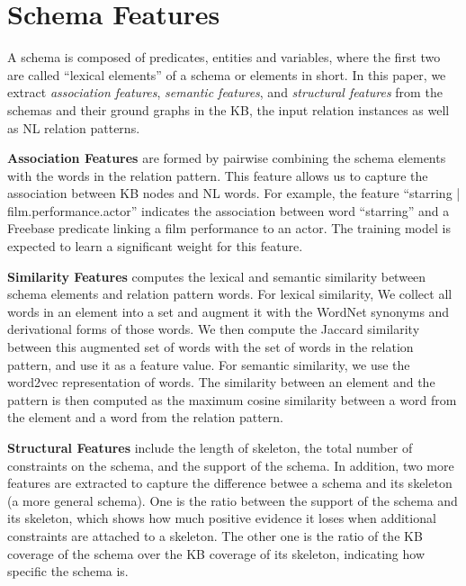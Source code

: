 \section{Schema Features}
\label{sec:feature}

A schema is composed of predicates, entities and variables, where
the first two are called ``lexical elements'' of a schema or elements
in short.
In this paper, we extract {\em association features}, {\em semantic features},
and {\em structural features} from the schemas and their ground graphs 
in the KB, the input relation instances as well as NL relation patterns.

\textbf{Association Features} are formed by pairwise combining 
the schema elements with the words in the relation pattern.
This feature allows us to capture the association between 
KB nodes and NL words.
For example, the feature ``starring | film.performance.actor''
indicates the association between word ``starring'' and a Freebase
predicate linking a film performance to an actor. The training model 
is expected to learn a significant weight for this feature.

\textbf{Similarity Features} computes the lexical and 
semantic similarity between schema elements and 
relation pattern words. For lexical similarity, 
We collect all words in an element into a set and augment it
with the WordNet synonyms and derivational forms of those words.
We then compute the Jaccard similarity between this augmented set of
words with the set of words in the relation pattern, 
and use it as a feature value. For semantic similarity,
we use the word2vec representation of words. 
The similarity between an element 
and the pattern is then computed as the maximum cosine
similarity between a word from the element and a word from the relation
pattern.

\textbf{Structural Features} include the length of skeleton, 
the total number of constraints on the schema, and the support of
the schema. In addition, two more features are extracted to capture
the difference betwee a schema and its skeleton (a more general schema). 
One is the ratio between the support of the schema and its skeleton, 
which shows how much positive evidence it loses 
when additional constraints are attached to a skeleton.
The other one is the ratio of the KB coverage of the schema 
over the KB coverage of its skeleton, indicating how specific the
schema is.

